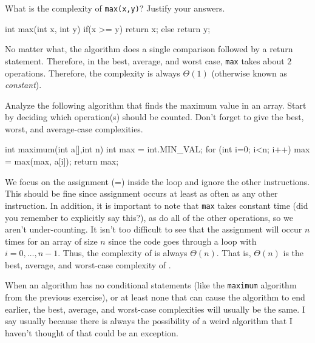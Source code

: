 \newpage

\begin{exa}
What is the complexity of \verb+max(x,y)+?  Justify your answers.
\begin{code}
	int max(int x, int y) {
	    if(x >= y) {
	        return x;
	    } else {
	        return y;
	    }
	}
\end{code}
\begin{sol}
No matter what, the algorithm does a single comparison followed by a return statement.  Therefore, in the best, average, and worst case, \verb+max+ takes
about $2$ operations. Therefore, the complexity is always $\Theta(1)$ 
(otherwise known as {\em constant}).
\end{sol}
\end{exa}


\begin{exer}
Analyze the following algorithm that finds the maximum value in an array.
Start by deciding which operation(s) should be counted.
Don't forget to give the best, worst, and average-case complexities.
\begin{code}
    int maximum(int a[],int n) {
        int max = int.MIN_VAL; 
        for (int i=0; i<n; i++)
            max = max(max, a[i]);
        return max; 
    } 
\end{code}
\vspace*{3in}

\begin{answer} 
We focus on the assignment (=) inside the loop and ignore the other instructions.
This should be fine since assignment occurs at least as often as any other instruction.  
In addition, it is important to note that \verb+max+ takes constant time
(did you remember to explicitly say this?), 
as do all of the other operations, so we aren't under-counting.
It isn't too difficult to see that the assignment will occur $n$ times for an array of size $n$
since the code goes through a loop with $i=0,\ldots, n-1$.
Thus, the complexity of  is always $\Theta(n)$.  That is, $\Theta(n)$ is the best, average, and worst-case complexity of .
\end{answer}
\end{exer}

When an algorithm has no conditional statements (like the \verb+maximum+ algorithm from the previous exercise),
or at least none that can cause the algorithm to end earlier, the best, average, and worst-case
complexities will usually be the same.  I say usually because there is always the possibility
of a weird algorithm that I haven't thought of that could be an exception.

